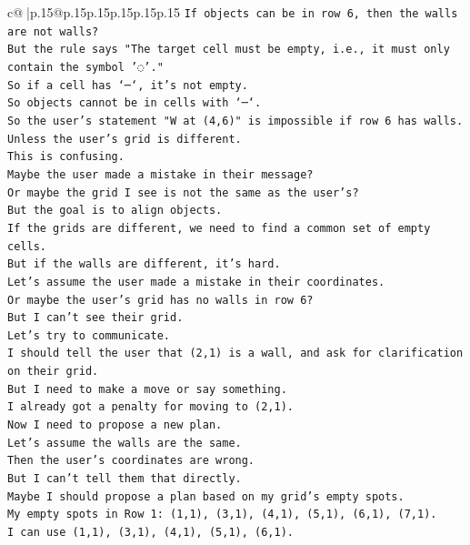\documentclass{article}
\begin{document}
{\begin{supertabular}{c@{$\;$}|p{.15\linewidth}@{}p{.15\linewidth}p{.15\linewidth}p{.15\linewidth}p{.15\linewidth}p{.15\linewidth}}
{{{\texttt{If objects can be in row 6, then the walls are not walls?} \\
\texttt{But the rule says "The target cell must be empty, i.e., it must only contain the symbol '◌'."} \\
\texttt{So if a cell has `─`, it's not empty.} \\
\texttt{So objects cannot be in cells with `─`.} \\
\texttt{So the user's statement "W at (4,6)" is impossible if row 6 has walls.} \\
\texttt{Unless the user's grid is different.} \\
\texttt{This is confusing.} \\
\texttt{Maybe the user made a mistake in their message?} \\
\texttt{Or maybe the grid I see is not the same as the user's?} \\
\texttt{But the goal is to align objects.} \\
\texttt{If the grids are different, we need to find a common set of empty cells.} \\
\texttt{But if the walls are different, it's hard.} \\
\texttt{Let's assume the user made a mistake in their coordinates.} \\
\texttt{Or maybe the user's grid has no walls in row 6?} \\
\texttt{But I can't see their grid.} \\
\texttt{Let's try to communicate.} \\
\texttt{I should tell the user that (2,1) is a wall, and ask for clarification on their grid.} \\
\texttt{But I need to make a move or say something.} \\
\texttt{I already got a penalty for moving to (2,1).} \\
\texttt{Now I need to propose a new plan.} \\
\texttt{Let's assume the walls are the same.} \\
\texttt{Then the user's coordinates are wrong.} \\
\texttt{But I can't tell them that directly.} \\
\texttt{Maybe I should propose a plan based on my grid's empty spots.} \\
\texttt{My empty spots in Row 1: (1,1), (3,1), (4,1), (5,1), (6,1), (7,1).} \\
\texttt{I can use (1,1), (3,1), (4,1), (5,1), (6,1).} \\
}}}
\end{supertabular}}
\end{document}
